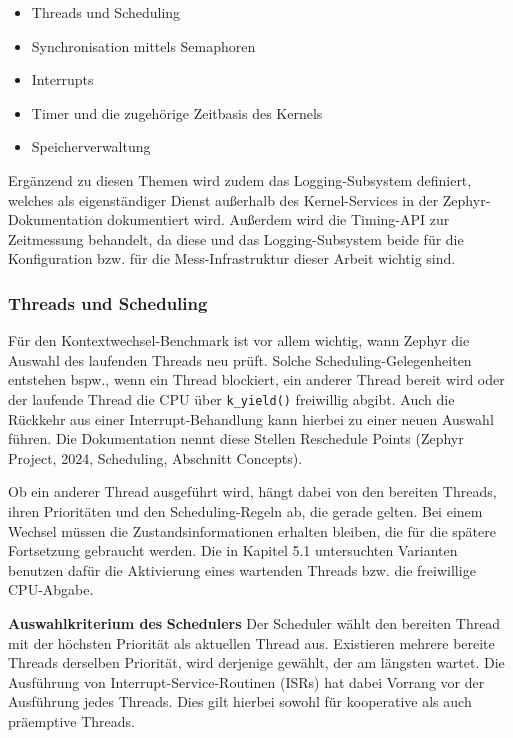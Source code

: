\begin{itemize}
\item Threads und Scheduling
\item Synchronisation mittels Semaphoren
\item Interrupts
\item Timer und die zugeh{\"o}rige Zeitbasis des Kernels
\item Speicherverwaltung
\end{itemize}
Erg{\"a}nzend zu diesen Themen wird zudem das Logging-Subsystem definiert, welches als eigenst{\"a}ndiger Dienst au{\ss}erhalb des Kernel-Services in der Zephyr-Dokumentation dokumentiert wird. Au{\ss}erdem wird die Timing-API zur Zeitmessung behandelt, da diese und das Logging-Subsystem beide f{\"u}r die Konfiguration bzw. f{\"u}r die Mess-Infrastruktur dieser Arbeit wichtig sind.

\subsubsection{Threads und Scheduling}
F{\"u}r den Kontextwechsel-Benchmark ist vor allem wichtig, wann Zephyr die Auswahl des laufenden Threads neu pr{\"u}ft. Solche Scheduling-Gelegenheiten entstehen bspw., wenn ein Thread blockiert, ein anderer Thread bereit wird oder der laufende Thread die CPU {\"u}ber \lstinline[style=codeinline]|k_yield()| freiwillig abgibt. Auch die R{\"u}ckkehr aus einer Interrupt-Behandlung kann hierbei zu einer neuen Auswahl f{\"u}hren. Die Dokumentation nennt diese Stellen Reschedule Points (Zephyr Project, 2024, \glqq{}Scheduling\grqq{}, Abschnitt \glqq{}Concepts\grqq{}).

Ob ein anderer Thread ausgef{\"u}hrt wird, h{\"a}ngt dabei von den bereiten Threads, ihren Priorit{\"a}ten und den Scheduling-Regeln ab, die gerade gelten. Bei einem Wechsel m{\"u}ssen die Zustandsinformationen erhalten bleiben, die f{\"u}r die sp{\"a}tere Fortsetzung gebraucht werden. Die in Kapitel 5.1 untersuchten Varianten benutzen daf{\"u}r die Aktivierung eines wartenden Threads bzw. die freiwillige CPU-Abgabe.

\textbf{Auswahlkriterium des} \textbf{Schedulers} Der Scheduler w{\"a}hlt den bereiten Thread mit der h{\"o}chsten Priorit{\"a}t als aktuellen Thread aus. Existieren mehrere bereite Threads derselben Priorit{\"a}t, wird derjenige gew{\"a}hlt, der am l{\"a}ngsten wartet. Die Ausf{\"u}hrung von Interrupt-Service-Routinen (ISRs) hat dabei Vorrang vor der Ausf{\"u}hrung jedes Threads. Dies gilt hierbei sowohl f{\"u}r kooperative als auch pr{\"a}emptive Threads.

